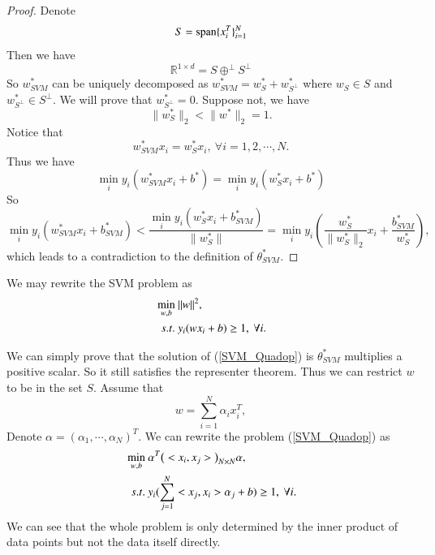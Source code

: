 \begin{proof}
	Denote
	\begin{equation}
		S = {\rm span} \{x_i^T\}_{i=1}^N
	\end{equation}
	Then we have
	\begin{equation}
		\mathbb{R}^{1\times d} = S \oplus^{\perp} S^{\perp}
	\end{equation}
	So $w_{SVM}^*$ can be uniquely decomposed as $w_{SVM}^* = w^*_S + w^*_{S^{\perp}}$ where $w_S\in S$ and $w^*_{S^{\perp}}\in S^{\perp}$. 
	We will prove that $w^*_{S^{\perp}} = 0$. Suppose not, we have
	\begin{equation}
		\|w^*_S\|_2 < \|w^*\|_2 = 1. 
	\end{equation}
	Notice that
	\begin{equation}
		w_{SVM}^* x_i = w_S^* x_i,\ \forall i = 1,2,\cdots,N.
	\end{equation}
	Thus we have
	\begin{equation}
		\min_{i} y_i(w_{SVM}^*x_i+b^*) = \min_{i} y_i(w_S^*x_i+b^*) 
	\end{equation}
	So
	\begin{equation}
	\min_{i} y_i(w_{SVM}^*x_i+b_{SVM}^*) < \frac{\min_{i} y_i(w_S^*x_i+b_{SVM}^*)}{\|w_S^*\|} = \min_{i} y_i(\frac{w^*_S}{\|w_S^*\|_2}x_i+\frac{b_{SVM}^*}{w^*_S}),
	\end{equation}
	which leads to a contradiction to the definition of $\theta_{SVM}^*$.
\end{proof}

We may rewrite the SVM problem as
\begin{align}{\label{SVM_Quadop}}
	\min_{w,b}&\ \|w\|^2,\\
	s.t.&\ y_i(wx_i+b) \geq 1,\ \forall i. 
\end{align}

We can simply prove that the solution of (\ref{SVM_Quadop}) is $\theta_{SVM}^*$ multiplies a positive scalar. So it still satisfies the representer theorem. Thus we can restrict $w$ to be in the set $S$. Assume that  
\begin{equation}
	w = \sum_{i = 1}^N \alpha_i x_i^T, 
\end{equation}
Denote $\alpha = (\alpha_1,\cdots,\alpha_N)^T$. We can rewrite the problem (\ref{SVM_Quadop}) as 
\begin{align}{\label{SVM_Quadop}}
\min_{w,b}&\ \alpha^T \big(<x_i,x_j>\big)_{N\times N} \alpha,\\
s.t.&\ y_i(\sum_{j = 1}^N <x_j,x_i>\alpha_j+b) \geq 1,\ \forall i. 
\end{align}
We can see that the whole problem is only determined by the inner product of data points but not the data itself directly. \\

